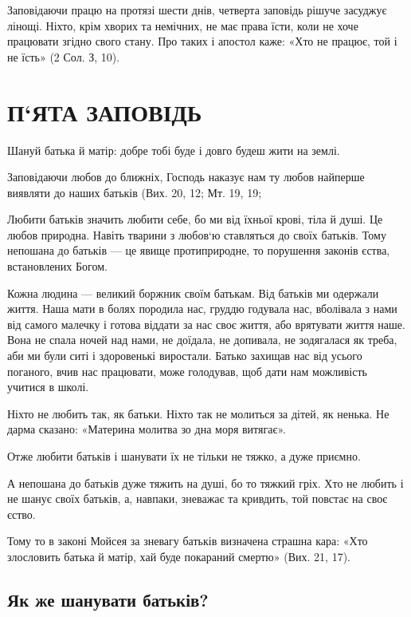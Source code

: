\documentclass[main.tex]{subfiles}
\begin{document}
Заповідаючи працю на протязі шести днів, четверта заповідь рішуче засуджує лінощі. Ніхто, крім хворих та немічних, не має права їсти, коли не хоче працювати згідно свого стану. Про таких і апостол каже: «Хто не працює, той і не їсть» (2 Сол. З, 10).

\section{П`ЯТА ЗАПОВІДЬ}

Шануй батька й матір: добре тобі буде і довго будеш жити на землі.

Заповідаючи любов до ближніх, Господь наказує нам ту любов найперше виявляти до наших батьків (Вих. 20, 12; Мт. 19, 19;

Любити батьків значить любити себе, бо ми від їхньої крові, тіла й душі. Це любов природна. Навіть тварини з любов`ю ставляться до своїх батьків. Тому непошана до батьків — це явище протиприродне, то порушення законів єства, встановлених Богом.

Кожна людина — великий боржник своїм батькам. Від батьків ми одержали життя. Наша мати в болях породила нас, груддю годувала нас, вболівала з нами від самого малечку і готова віддати за нас своє життя, або врятувати життя наше. Вона не спала ночей над нами, не доїдала, не допивала, не зодягалася як треба, аби ми були ситі і здоровенькі виростали. Батько захищав нас від усього поганого, вчив нас працювати, може голодував, щоб дати нам можливість учитися в школі.

Ніхто не любить так, як батьки. Ніхто так не молиться за дітей, як ненька. Не дарма сказано: «Материна молитва зо дна моря витягає».

Отже любити батьків і шанувати їх не тільки не тяжко, а дуже приємно.

А непошана до батьків дуже тяжить на душі, бо то тяжкий гріх. Хто не любить і не шанує своїх батьків, а, навпаки, зневажає та кривдить, той повстає на своє єство.

Тому то в законі Мойсея за зневагу батьків визначена страшна кара: «Хто злословить батька й матір, хай буде покараний смертю» (Вих. 21, 17).
 
\subsection{Як же шанувати батьків?}
\end{document}
